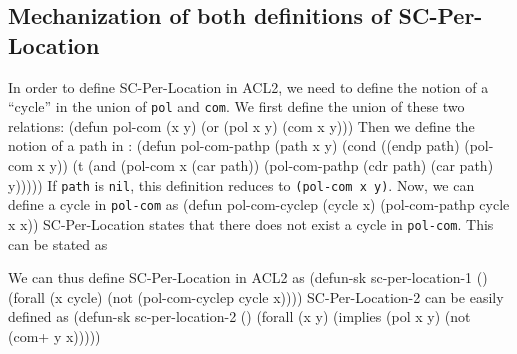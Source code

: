 \documentclass[]{eptcs}
\newenvironment{qv}
{\quote\Verbatim}
{\endVerbatim\endquote}
\begin{document}
\subsection{Mechanization of both definitions of SC-Per-Location}

In order to define SC-Per-Location in ACL2, we need to define the notion of a ``cycle'' in the union of \verb|pol| and \verb|com|. We first define the union of these two relations:
\begin{qv}
(defun pol-com (x y)
  (or (pol x y)
      (com x y)))
\end{qv}
Then we define the notion of a path in :
\begin{qv}
(defun pol-com-pathp (path x y)
  (cond ((endp path) (pol-com x y))
        (t (and (pol-com x (car path))
                (pol-com-pathp (cdr path) (car path) y)))))
\end{qv}
If \verb|path| is \verb|nil|, this definition reduces to \verb|(pol-com x y)|. Now, we can define a cycle in \verb|pol-com| as
\begin{qv}
(defun pol-com-cyclep (cycle x)
  (pol-com-pathp cycle x x))
\end{qv}
SC-Per-Location states that there does not exist a cycle in \verb|pol-com|. This can be stated as 

We can thus define SC-Per-Location in ACL2 as
\begin{qv}
(defun-sk sc-per-location-1 ()
  (forall (x cycle)
          (not (pol-com-cyclep cycle x))))
\end{qv}
SC-Per-Location-2 can be easily defined as
\begin{qv}
(defun-sk sc-per-location-2 ()
  (forall (x y)
          (implies (pol x y)
                   (not (com+ y x)))))
\end{qv}
\end{document}
